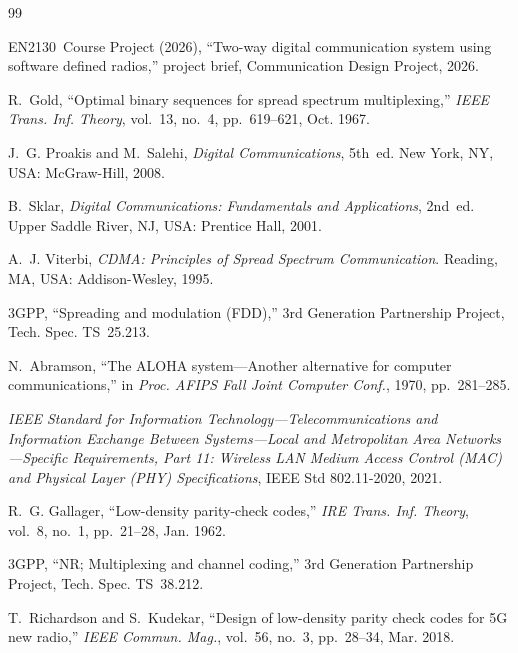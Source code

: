 \documentclass[11pt,a4paper,oneside]{report}
\newcommand{\CourseCode}{EN2130}
\newcommand{\CourseName}{Communication Design Project}
\begin{document}
\renewcommand{\bibname}{References}
\begingroup
\small
\begin{thebibliography}{99}
\setlength{\itemsep}{2pt}

 \CourseCode\ Course Project (2026), ``Two-way digital communication system using
software defined radios,'' project brief, \CourseName, 2026.

 R.~Gold, ``Optimal binary sequences for spread spectrum multiplexing,''
\emph{IEEE Trans. Inf. Theory}, vol.~13, no.~4, pp.~619--621, Oct. 1967.

 J.~G. Proakis and M.~Salehi, \emph{Digital Communications}, 5th~ed.
New York, NY, USA: McGraw-Hill, 2008.

 B.~Sklar, \emph{Digital Communications: Fundamentals and Applications}, 2nd~ed.
Upper Saddle River, NJ, USA: Prentice Hall, 2001.

 A.~J. Viterbi, \emph{CDMA: Principles of Spread Spectrum Communication}.
Reading, MA, USA: Addison-Wesley, 1995.

 3GPP, ``Spreading and modulation (FDD),'' 3rd Generation Partnership Project, Tech.
Spec. TS~25.213.

 N.~Abramson, ``The ALOHA system---Another alternative for computer
communications,'' in \emph{Proc. AFIPS Fall Joint Computer Conf.}, 1970, pp.~281--285.

 \emph{IEEE Standard for Information Technology---Telecommunications and
Information Exchange Between Systems---Local and Metropolitan Area Networks---Specific Requirements,
Part 11: Wireless LAN Medium Access Control (MAC) and Physical Layer (PHY) Specifications},
IEEE Std 802.11-2020, 2021.

 R.~G. Gallager, ``Low-density parity-check codes,'' \emph{IRE Trans. Inf.
Theory}, vol.~8, no.~1, pp.~21--28, Jan. 1962.

 3GPP, ``NR; Multiplexing and channel coding,'' 3rd Generation Partnership
Project, Tech. Spec. TS~38.212.

 T.~Richardson and S.~Kudekar, ``Design of low-density parity check codes
for 5G new radio,'' \emph{IEEE Commun. Mag.}, vol.~56, no.~3, pp.~28--34, Mar. 2018.


\end{thebibliography}
\end{document}
